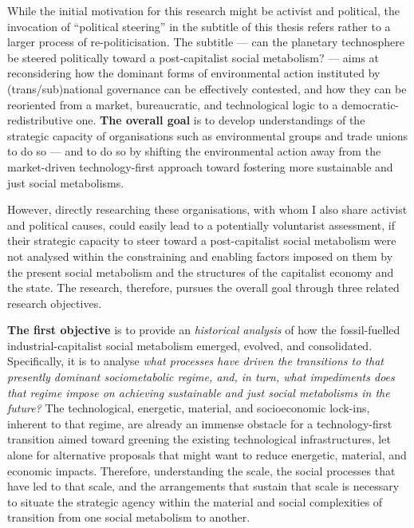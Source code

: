\documentclass[a4paper, nobind]{templates/ociamthesis}
\begin{document}
While the initial motivation for this research might be activist and political, the invocation of ``political steering'' in the subtitle of this thesis refers rather to a larger process of re-politicisation. The subtitle --- can the planetary technosphere be steered politically toward a post-capitalist social metabolism? --- aims at reconsidering how the dominant forms of environmental action instituted by (trans/sub)national governance can be effectively contested, and how they can be reoriented from a market, bureaucratic, and technological logic to a democratic-redistributive one. \textbf{The overall goal} is to develop understandings of the strategic capacity of organisations such as environmental groups and trade unions to do so --- and to do so by shifting the environmental action away from the market-driven technology-first approach toward fostering more sustainable and just social metabolisms.

However, directly researching these organisations, with whom I also share activist and political causes, could easily lead to a potentially voluntarist assessment, if their strategic capacity to steer toward a post-capitalist social metabolism were not analysed within the constraining and enabling factors imposed on them by the present social metabolism and the structures of the capitalist economy and the state. The research, therefore, pursues the overall goal through three related research objectives.

\textbf{The first objective} is to provide an \emph{historical analysis} of how the fossil-fuelled industrial-capitalist social metabolism emerged, evolved, and consolidated. Specifically, it is to analyse \emph{what processes have driven the transitions to that presently dominant sociometabolic regime, and, in turn, what impediments does that regime impose on achieving sustainable and just social metabolisms in the future?} The technological, energetic, material, and socioeconomic lock-ins, inherent to that regime, are already an immense obstacle for a technology-first transition aimed toward greening the existing technological infrastructures, let alone for alternative proposals that might want to reduce energetic, material, and economic impacts. Therefore, understanding the scale, the social processes that have led to that scale, and the arrangements that sustain that scale is necessary to situate the strategic agency within the material and social complexities of transition from one social metabolism to another.
\end{document}
